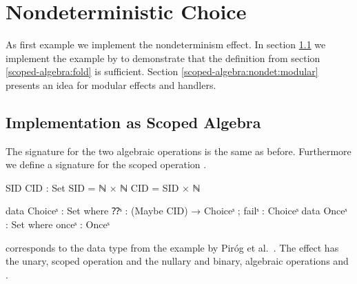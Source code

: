 \section{Nondeterministic Choice}

As first example we implement the nondeterminism effect.
In section \ref{scoped-algebra:nondet:scoped-algebra} we implement the example
by \textcite{DBLP:conf/lics/PirogSWJ18} to demonstrate that the
 definition from section \ref{scoped-algebra:fold} is
sufficient.
Section \ref{scoped-algebra:nondet:modular} presents an idea for modular effects
and handlers.

\subsection{Implementation as Scoped Algebra}
\label{scoped-algebra:nondet:scoped-algebra}
The signature for the two algebraic operations is the same as before.
Furthermore we define a signature for the scoped operation .

\begin{code}[hide]
SID CID : Set
SID = ℕ × ℕ
CID = SID × ℕ
\end{code}
\begin{code}
data Choiceˢ  : Set where ⁇ˢ : (Maybe CID) → Choiceˢ ; failˢ : Choiceˢ
data Onceˢ    : Set where onceˢ : Onceˢ
\end{code}
 corresponds to the data type from the example by Piróg et
al.~\cite[sec.~6]{DBLP:conf/lics/PirogSWJ18}.
The effect has the unary, scoped operation  and the nullary
and binary, algebraic operations  and .

